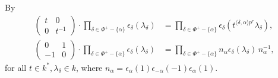 By \cite[Theorem 26.3(c)]{humphreys1975linear}
\begin{align}
	\label{eqn:t_act}
	\left(\begin{matrix} t & 0 \\ 0 & t^{-1}\end{matrix}\right) \cdot \prod_{\delta\in\Phi^+-\{\alpha\}} \epsilon_\delta (\lambda_\delta) &=
	\prod_{\delta\in\Phi^+-\{\alpha\}} \epsilon_\delta\left(t^{\langle \delta, \alpha \rangle p^r} \lambda_\delta\right), \\ 
	\label{eqn:n_act}
	\left(\begin{matrix} 0 & 1 \\ -1 & 0 \end{matrix}\right) \cdot \prod_{\delta\in\Phi^+-\{\alpha\}}\epsilon_\delta (\lambda_\delta) &=
	\prod_{\delta\in\Phi^+-\{\alpha\}} n_\alpha \epsilon_\delta \left( \lambda_\delta\right)\, n_\alpha^{-1},
\end{align}
for all $t \in k^*, \lambda_\delta \in k$, where $n_\alpha = \epsilon_\alpha(1)\epsilon_{-\alpha}(-1)\epsilon_\alpha(1)$.

